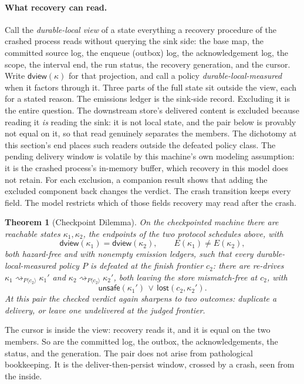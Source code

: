 \documentclass[sigplan,10pt]{acmart}
\theoremstyle{plain}
\newtheorem{theorem}{Theorem}
\theoremstyle{definition}
\newcommand{\unsafe}{\mathsf{unsafe}}
\newcommand{\lostp}{\mathsf{lost}}
\newcommand{\dlv}{\mathsf{dview}}          %
\newcommand{\rdrto}[2]{\mathrel{\rightsquigarrow_{#1\langle #2\rangle}}} %
\begin{document}
\paragraph{What recovery can read.}
Call the \emph{durable-local view} of a state everything a recovery
procedure of the crashed process reads without querying the sink side:
the base map, the committed source log, the enqueue (outbox) log, the
acknowledgement log, the scope, the interval end, the run status, the
recovery generation, and the cursor. Write $\dlv(\kappa)$ for that
projection, and call a policy \emph{durable-local-measured} when it
factors through it. Three parts of the full state sit outside the view,
each for a stated reason. The emissions ledger is the sink-side record.
Excluding it is the entire question. The downstream store's
delivered content is excluded because reading it \emph{is} reading the
sink: it is not local state, and the pair below is provably not
equal on it, so that read genuinely separates the members. The
dichotomy at this section's end places such readers outside the
defeated policy class. The pending delivery window is
volatile by this machine's own modeling assumption: it is the crashed
process's in-memory buffer, which recovery in this model does not
retain. For each exclusion, a companion result shows that adding the
excluded component back changes the
verdict. The crash transition keeps every field. The model restricts which
of those fields recovery may read after the crash.

\begin{theorem}[Checkpoint Dilemma]\label{thm:checkpoint}
On the checkpointed machine there are reachable states
$\kappa_1, \kappa_2$, the endpoints of the two protocol schedules
above, with
\[
  \dlv(\kappa_1) = \dlv(\kappa_2), \qquad
  E(\kappa_1) \neq E(\kappa_2),
\]
both hazard-free and with nonempty emission ledgers, such that every
durable-local-measured policy $P$ is defeated at the finish frontier
$c_2$: there are re-drives
$\kappa_1 \rdrto{P}{c_2} \kappa_1'$ and
$\kappa_2 \rdrto{P}{c_2} \kappa_2'$, both leaving the store
mismatch-free at $c_2$, with
\[
  \unsafe(\kappa_1') \,\vee\, \lostp(c_2, \kappa_2').
\]
At this pair the checked verdict again sharpens to two outcomes: duplicate
a delivery, or leave one undelivered at the judged frontier.
\end{theorem}

The cursor is inside the view: recovery reads it, and it is equal on
the two members. So are the committed log, the outbox, the
acknowledgements, the status, and the generation. The pair does not
arise from pathological bookkeeping. It is the deliver-then-persist
window, crossed by a crash, seen from the inside.
\end{document}
